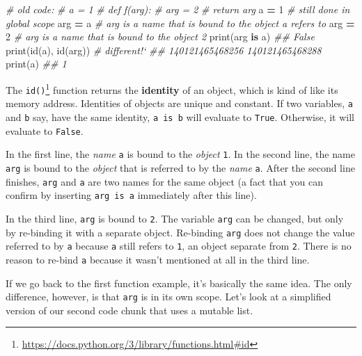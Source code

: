 \documentclass[12pt,krantz2]{krantz}
\makeatletter
\newenvironment{Shaded}{\begin{snugshade}}{\end{snugshade}}
\newcommand{\BuiltInTok}[1]{#1}
\newcommand{\CommentTok}[1]{\textcolor[rgb]{0.37,0.37,0.37}{\textit{#1}}}
\newcommand{\DecValTok}[1]{\textcolor[rgb]{0.06,0.06,0.06}{#1}}
\newcommand{\KeywordTok}[1]{\textcolor[rgb]{0.27,0.27,0.27}{\textbf{#1}}}
\newcommand{\NormalTok}[1]{#1}
\newcommand{\OperatorTok}[1]{\textcolor[rgb]{0.43,0.43,0.43}{\textbf{#1}}}
\renewcommand{\href}[2]{#2\footnote{\url{#1}}}
\newenvironment{kframe}{%
\medskip{}
\setlength{\fboxsep}{.8em}
 \def\at@end@of@kframe{}%
 \ifinner\ifhmode%
  \def\at@end@of@kframe{\end{minipage}}%
  \begin{minipage}{\columnwidth}%
 \fi\fi%
 \def\FrameCommand##1{\hskip\@totalleftmargin \hskip-\fboxsep
 \colorbox{shadecolor}{##1}\hskip-\fboxsep
     \hskip-\linewidth \hskip-\@totalleftmargin \hskip\columnwidth}%
 \MakeFramed {\advance\hsize-\width
   \@totalleftmargin\z@ \linewidth\hsize
   \@setminipage}}%
 {\par\unskip\endMakeFramed%
 \at@end@of@kframe}
\renewenvironment{Shaded}{\begin{kframe}}{\end{kframe}}
\makeatother
\begin{document}
\begin{Shaded}
\begin{Highlighting}[]
\CommentTok{# old code: }
\CommentTok{# a = 1}
\CommentTok{# def f(arg):}
\CommentTok{#     arg = 2}
\CommentTok{#     return arg}
\NormalTok{a }\OperatorTok{=} \DecValTok{1}    \CommentTok{# still done in global scope}
\NormalTok{arg }\OperatorTok{=}\NormalTok{ a  }\CommentTok{# arg is a name that is bound to the object a refers to}
\NormalTok{arg }\OperatorTok{=} \DecValTok{2}  \CommentTok{# arg is a name that is bound to the object 2}
\BuiltInTok{print}\NormalTok{(arg }\KeywordTok{is}\NormalTok{ a)}
\CommentTok{## False}
\BuiltInTok{print}\NormalTok{(}\BuiltInTok{id}\NormalTok{(a), }\BuiltInTok{id}\NormalTok{(arg)) }\CommentTok{# different!`}
\CommentTok{## 140121465468256 140121465468288}
\BuiltInTok{print}\NormalTok{(a)}
\CommentTok{## 1}
\end{Highlighting}
\end{Shaded}

\begin{rmd-details}
The \href{https://docs.python.org/3/library/functions.html\#id}{\texttt{id()}} function returns the \textbf{identity} of an object, which is kind of like its memory address. Identities of objects are unique and constant. If two variables, \texttt{a} and \texttt{b} say, have the same identity, \texttt{a\ is\ b} will evaluate to \texttt{True}. Otherwise, it will evaluate to \texttt{False}.

\end{rmd-details}

In the first line, the \emph{name} \texttt{a} is bound to the \emph{object} \texttt{1}. In the second line, the name \texttt{arg} is bound to the \emph{object} that is referred to by the \emph{name} \texttt{a}. After the second line finishes, \texttt{arg} and \texttt{a} are two names for the same object (a fact that you can confirm by inserting \texttt{arg\ is\ a} immediately after this line).

In the third line, \texttt{arg} is bound to \texttt{2}. The variable \texttt{arg} can be changed, but only by re-binding it with a separate object. Re-binding \texttt{arg} does not change the value referred to by \texttt{a} because \texttt{a} still refers to \texttt{1}, an object separate from \texttt{2}. There is no reason to re-bind \texttt{a} because it wasn't mentioned at all in the third line.

If we go back to the first function example, it's basically the same idea. The only difference, however, is that \texttt{arg} is in its own scope. Let's look at a simplified version of our second code chunk that uses a mutable list.
\end{document}
